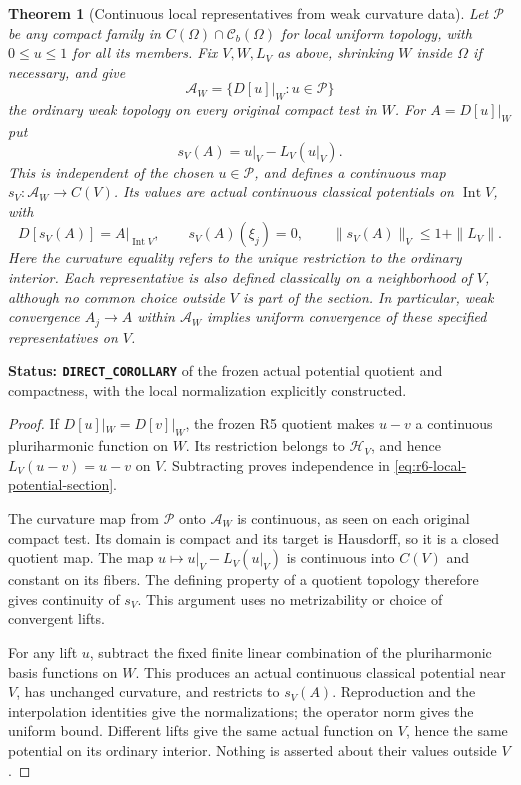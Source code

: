 \documentclass[11pt,a4paper]{article}
\numberwithin{equation}{section}
\newtheorem{theorem}{Theorem}[section]
\theoremstyle{definition}
\theoremstyle{remark}
\begin{document}
\begin{theorem}[Continuous local representatives from weak curvature data]
\label{thm:r6-local-continuous-potential-section}
Let $\mathscr P$ be any compact family in
$C(\Omega)\cap\mathcal C_b(\Omega)$ for local uniform topology,
with $0\le u\le1$ for all its members. Fix $V,W,L_V$ as above,
shrinking $W$ inside $\Omega$ if necessary, and give
\[
             \mathscr A_W=\{D[u]|_W:u\in\mathscr P\}
\]
the ordinary weak topology on every original compact test in $W$.
For $A=D[u]|_W$ put
\begin{equation}
                    s_V(A)=u|_V-L_V(u|_V).
 \label{eq:r6-local-potential-section}
\end{equation}
This is independent of the chosen $u\in\mathscr P$, and defines
a continuous map $s_V:\mathscr A_W\to C(V)$. Its values are actual
continuous classical potentials on $\operatorname{Int}V$, with
\[
 D[s_V(A)]=A|_{\operatorname{Int}V},\qquad
 s_V(A)(\xi_j)=0,\qquad
 \|s_V(A)\|_V\le1+\|L_V\|.
\]
Here the curvature equality refers to the unique restriction to the
ordinary interior. Each representative is also defined classically
on a neighborhood of $V$, although no common choice outside $V$ is
part of the section. In particular, weak convergence $A_j\to A$
within $\mathscr A_W$ implies uniform convergence of these specified
representatives on $V$.
\end{theorem}

\noindent\textbf{Status: \texttt{DIRECT\_COROLLARY}} of the
frozen actual potential quotient and compactness, with the local
normalization explicitly constructed.

\begin{proof}
If $D[u]|_W=D[v]|_W$, the frozen R5 quotient makes $u-v$ a continuous
pluriharmonic function on $W$. Its restriction belongs to $\mathscr H_V$,
and hence $L_V(u-v)=u-v$ on $V$. Subtracting proves independence in
\eqref{eq:r6-local-potential-section}.

The curvature map from $\mathscr P$ onto $\mathscr A_W$ is continuous,
as seen on each original compact test. Its domain is compact and its
target is Hausdorff, so it is a closed quotient map. The map
$u\mapsto u|_V-L_V(u|_V)$ is continuous into $C(V)$ and constant on
its fibers. The defining property of a quotient topology therefore
gives continuity of $s_V$. This argument uses no metrizability or
choice of convergent lifts.

For any lift $u$, subtract the fixed finite linear combination of the
pluriharmonic basis functions on $W$. This produces an actual continuous
classical potential near $V$, has unchanged curvature, and restricts
to $s_V(A)$. Reproduction and the interpolation identities give the
normalizations; the operator norm gives the uniform bound. Different
lifts give the same actual function on $V$, hence the same potential
on its ordinary interior. Nothing is asserted about their values
outside $V$.
\end{proof}
\end{document}
